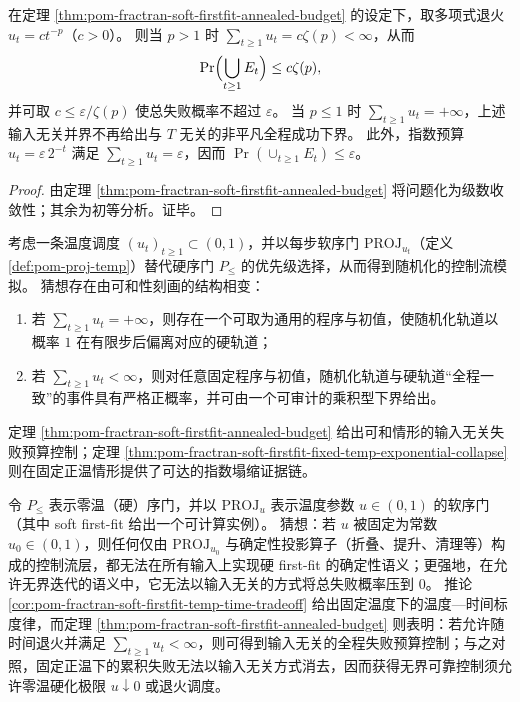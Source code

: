 \begin{corollary}\label{cor:pom-fractran-soft-firstfit-cooling-threshold}
在定理 \ref{thm:pom-fractran-soft-firstfit-annealed-budget} 的设定下，取多项式退火 \(u_t=ct^{-p}\)（\(c>0\)）。
则当 \(p>1\) 时 \(\sum_{t\ge 1}u_t=c\zeta(p)<\infty\)，从而
\[
\Pr\Bigl(\bigcup_{t\ge 1}E_t\Bigr)\le c\zeta(p),
\]
并可取 \(c\le \varepsilon/\zeta(p)\) 使总失败概率不超过 \(\varepsilon\)。
当 \(p\le 1\) 时 \(\sum_{t\ge 1}u_t=+\infty\)，上述输入无关并界不再给出与 \(T\) 无关的非平凡全程成功下界。
此外，指数预算 \(u_t=\varepsilon\,2^{-t}\) 满足 \(\sum_{t\ge 1}u_t=\varepsilon\)，因而 \(\Pr(\cup_{t\ge 1}E_t)\le \varepsilon\)。
\end{corollary}
\begin{proof}
由定理 \ref{thm:pom-fractran-soft-firstfit-annealed-budget} 将问题化为级数收敛性；其余为初等分析。证毕。
\end{proof}

\begin{conjecture}\label{conj:pom-soft-order-cooling-summability-phase-transition}
考虑一条温度调度 \((u_t)_{t\ge 1}\subset(0,1)\)，并以每步软序门 \(\mathrm{PROJ}_{u_t}\)（定义 \ref{def:pom-proj-temp}）替代硬序门 \(P_{\le}\) 的优先级选择，从而得到随机化的控制流模拟。
猜想存在由可和性刻画的结构相变：
\begin{enumerate}
  \item 若 \(\sum_{t\ge 1}u_t=+\infty\)，则存在一个可取为通用的程序与初值，使随机化轨道以概率 \(1\) 在有限步后偏离对应的硬轨道；
  \item 若 \(\sum_{t\ge 1}u_t<\infty\)，则对任意固定程序与初值，随机化轨道与硬轨道“全程一致”的事件具有严格正概率，并可由一个可审计的乘积型下界给出。
\end{enumerate}
定理 \ref{thm:pom-fractran-soft-firstfit-annealed-budget} 给出可和情形的输入无关失败预算控制；定理 \ref{thm:pom-fractran-soft-firstfit-fixed-temp-exponential-collapse} 则在固定正温情形提供了可达的指数塌缩证据链。
\end{conjecture}

\begin{conjecture}\label{conj:pom-soft-order-fixed-temp-not-deterministic}
令 \(P_{\le}\) 表示零温（硬）序门，并以 \(\mathrm{PROJ}_u\) 表示温度参数 \(u\in(0,1)\) 的软序门（其中 soft first-fit 给出一个可计算实例）。
猜想：若 \(u\) 被固定为常数 \(u_0\in(0,1)\)，则任何仅由 \(\mathrm{PROJ}_{u_0}\) 与确定性投影算子（折叠、提升、清理等）构成的控制流层，都无法在所有输入上实现硬 first-fit 的确定性语义；更强地，在允许无界迭代的语义中，它无法以输入无关的方式将总失败概率压到 \(0\)。
推论 \ref{cor:pom-fractran-soft-firstfit-temp-time-tradeoff} 给出固定温度下的温度—时间标度律，而定理 \ref{thm:pom-fractran-soft-firstfit-annealed-budget} 则表明：若允许随时间退火并满足 \(\sum_{t\ge 1}u_t<\infty\)，则可得到输入无关的全程失败预算控制；与之对照，固定正温下的累积失败无法以输入无关方式消去，因而获得无界可靠控制须允许零温硬化极限 \(u\downarrow 0\) 或退火调度。
\end{conjecture}

